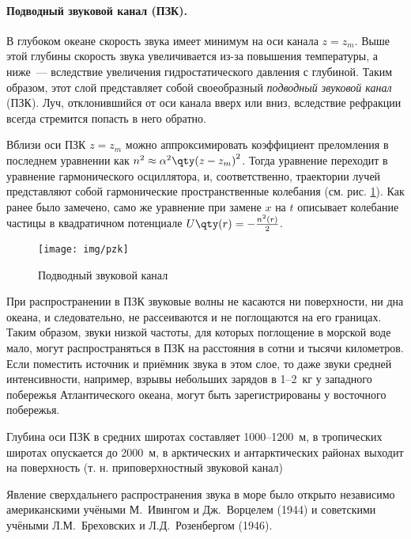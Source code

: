 \paragraph{Подводный звуковой канал (ПЗК). }
В глубоком океане скорость звука имеет минимум на оси канала $z= z_m$. Выше этой глубины скорость звука увеличивается из-за повышения температуры, а ниже~--- вследствие увеличения гидростатического давления с глубиной.
Таким образом, этот слой представляет собой своеобразный \textit{подводный звуковой канал} (ПЗК). Луч, отклонившийся от оси канала вверх или вниз, вследствие рефракции всегда стремится попасть в него обратно.

Вблизи оси ПЗК $z= z_m$ можно аппроксимировать коэффициент преломления в последнем уравнении как $n^2 \approx \alpha^2 {\qty(z- z_m)}^2$. Тогда уравнение переходит в уравнение гармонического осциллятора, и, соответственно, траектории лучей представляют собой гармонические пространственные колебания (см. рис. \ref{fig:pzk}). Как ранее было замечено, само же уравнение при замене $x$ на $t$ описывает колебание частицы в квадратичном потенциале $U \qty(r) =- \frac{n^2 (r)}{2}$.


\begin{figure}[H]
	\centering
	\hspace{1cm}\texttt{[image: img/pzk]}
	\caption{Подводный звуковой канал}
	\label{fig:pzk}
\end{figure}

При распространении в ПЗК звуковые волны не касаются ни поверхности, ни дна океана, и следовательно, не рассеиваются и не поглощаются на его границах. Таким образом, звуки низкой частоты, для которых поглощение в морской воде мало, могут распространяться в ПЗК на расстояния в сотни и тысячи километров. Если поместить источник и приёмник звука в этом слое, то даже звуки средней интенсивности, например, взрывы небольших зарядов в 1--2~кг у западного побережья Атлантического океана, могут быть зарегистрированы у восточного побережья.

Глубина оси ПЗК в средних широтах составляет 1000--1200~м, в тропических широтах опускается до 2000~м, в арктических и антарктических районах выходит на поверхность (т. н. приповерхностный звуковой канал)

Явление сверхдальнего распространения звука в море было открыто независимо американскими учёными М.~Ивингом и Дж.~Ворцелем (1944) и советскими учёными Л.М.~Бреховских и Л.Д.~Розенбергом (1946).

